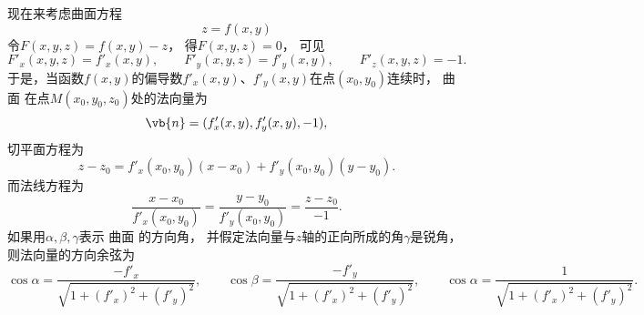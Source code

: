 现在来考虑曲面方程
\begin{equation}\label{equation:多元函数微分学的几何应用.曲面上的曲线.中间步骤3}
	z = f(x,y)
\end{equation}
令\(F(x,y,z)=f(x,y)-z\)，
得\(F(x,y,z)=0\)，
可见\begin{equation*}
	F'_x(x,y,z) = f'_x(x,y),
	\qquad
	F'_y(x,y,z) = f'_y(x,y),
	\qquad
	F'_z(x,y,z) = -1.
\end{equation*}
于是，当函数\(f(x,y)\)的偏导数\(f'_x(x,y)\)、\(f'_y(x,y)\)在点\((x_0,y_0)\)连续时，
曲面 
在点\(M(x_0,y_0,z_0)\)处的法向量为\begin{equation*}
	\vb{n}=(f'_x(x,y),f'_y(x,y),-1),
\end{equation*}
切平面方程为\begin{equation}\label{equation:多元函数微分学的几何应用.曲面的切平面方程.变式1}
	z-z_0 = f'_x(x_0,y_0) (x-x_0) + f'_y(x_0,y_0) (y-y_0).
\end{equation}
而法线方程为\begin{equation}\label{equation:多元函数微分学的几何应用.曲面的法线方程.变式1}
	\frac{x-x_0}{f'_x(x_0,y_0)}
	=\frac{y-y_0}{f'_y(x_0,y_0)}
	=\frac{z-z_0}{-1}.
\end{equation}
如果用\(\alpha,\beta,\gamma\)表示
曲面  的方向角，
并假定法向量与\(z\)轴的正向所成的角\(\gamma\)是锐角，
则法向量的方向余弦为\begin{equation*}
	\cos\alpha=\frac{-f'_x}{\sqrt{1+(f'_x)^2+(f'_y)^2}}, \qquad
	\cos\beta=\frac{-f'_y}{\sqrt{1+(f'_x)^2+(f'_y)^2}}, \qquad
	\cos\alpha=\frac{1}{\sqrt{1+(f'_x)^2+(f'_y)^2}}.
\end{equation*}

